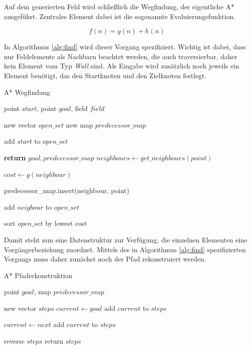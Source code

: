 \documentclass[10pt,twocolumn]{scrartcl}
\begin{document}
Auf dem generierten Feld wird schließlich die Wegfindung, der eigentliche A* ausgeführt. Zentrales Element dabei ist die sogenannte Evaluierungsfunktion. 

\begin{equation}
f(n) = g(n) + h(n)
\end{equation}

In Algorithmus \ref{alg:find} wird dieser Vorgang spezifiziert. Wichtig ist dabei, dass nur Feldelemente als Nachbarn beachtet werden, die auch traversierbar, daher kein Element vom Typ \textit{Wall} sind. Als Eingabe wird zusätzlich noch jeweils ein Element benötigt, das den Startknoten und den Zielknoten festlegt.

\begin{algorithm} 
\caption{A* Wegfindung} 
\label{alg:find} 
\begin{algorithmic}
	\REQUIRE point $start$, point $goal$, field $field$ 	
	
	\STATE new vector $open\_set$
	\STATE new map $predecessor\_map$ 
	
	\STATE add $start$ to $open\_set$
	
	\STATE \textbf{return} $goal, predecessor\_map$	
	\ENDIF
	\STATE $neighbours \leftarrow get\_neighbours(point)$
	
	
	\STATE $cost \leftarrow	g(neighbour)$
	

	\STATE predecessor_map.insert(neighbour, point)
	
	\STATE add $neigbour$ to $open\_set$	
	
	\ENDIF
	
	\STATE sort $open\_set$ by lowest cost		
		
	\ENDFOR
	\ENDWHILE
\end{algorithmic}
\end{algorithm}

Damit steht nun eine Datenstruktur zur Verfügung, die einzelnen Elementen eine Vorgängerbeziehung zuordnet. Mittels des in Algorithmus \ref{alg:find} spezifizierten Vorgangs muss daher zunächst noch der Pfad rekonstruiert werden.

\begin{algorithm} 
\caption{A* Pfadrekonstruktion} 
\label{alg:rec} 
\begin{algorithmic}
	\REQUIRE point $goal$, map $predecessor\_map$
	
	\STATE new vector $steps$	
	\STATE $current \leftarrow goal$
	\STATE add $current$ to $steps$
	
	
	\STATE $current \leftarrow next$
	\STATE add $current$ to $steps$

	\ENDWHILE
	\STATE reverse $steps$
	\STATE return $steps$
	
\end{algorithmic}
\end{algorithm}
\end{document}
